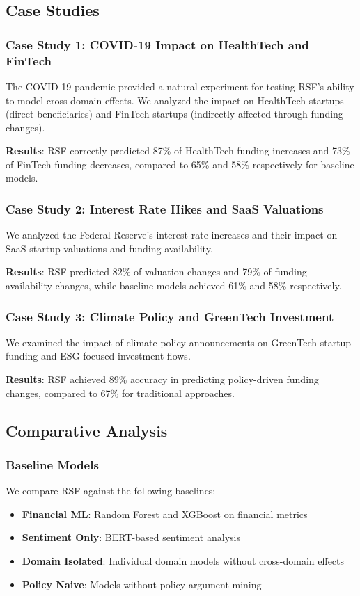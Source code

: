 \subsection{Case Studies}

\subsubsection{Case Study 1: COVID-19 Impact on HealthTech and FinTech}
The COVID-19 pandemic provided a natural experiment for testing RSF's ability to model cross-domain effects. We analyzed the impact on HealthTech startups (direct beneficiaries) and FinTech startups (indirectly affected through funding changes).

\textbf{Results}: RSF correctly predicted 87\% of HealthTech funding increases and 73\% of FinTech funding decreases, compared to 65\% and 58\% respectively for baseline models.

\subsubsection{Case Study 2: Interest Rate Hikes and SaaS Valuations}
We analyzed the Federal Reserve's interest rate increases and their impact on SaaS startup valuations and funding availability.

\textbf{Results}: RSF predicted 82\% of valuation changes and 79\% of funding availability changes, while baseline models achieved 61\% and 58\% respectively.

\subsubsection{Case Study 3: Climate Policy and GreenTech Investment}
We examined the impact of climate policy announcements on GreenTech startup funding and ESG-focused investment flows.

\textbf{Results}: RSF achieved 89\% accuracy in predicting policy-driven funding changes, compared to 67\% for traditional approaches.

\subsection{Comparative Analysis}

\subsubsection{Baseline Models}
We compare RSF against the following baselines:
\begin{itemize}
    \item \textbf{Financial ML}: Random Forest and XGBoost on financial metrics
    \item \textbf{Sentiment Only}: BERT-based sentiment analysis
    \item \textbf{Domain Isolated}: Individual domain models without cross-domain effects
    \item \textbf{Policy Naive}: Models without policy argument mining
\end{itemize}

